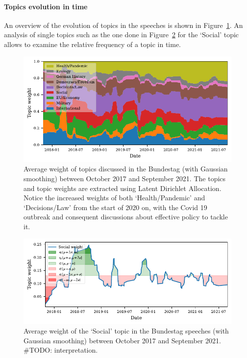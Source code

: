 \documentclass{article}
\begin{document}
\paragraph{Topics evolution in time}
An overview of the evolution of topics in the speeches is shown in Figure~\ref{stacked_area_plot}.
An analysis of single topics such as the one done in Figure~\ref{social_topic_plot} for the `Social' topic allows to examine the relative frequency of a topic in time.

\begin{figure}
  \centering
  \includegraphics[width=0.9\linewidth]{images/stacked_area_plot.pdf}
  \captionsetup{width=0.9\linewidth}
  \caption{
    Average weight of topics discussed in the Bundestag (with Gaussian smoothing) between October 2017 and September 2021.
    The topics and topic weights are extracted using Latent Dirichlet Allocation.
    Notice the increased weights of both `Health/Pandemic' and `Decisions/Law' from the start of 2020 on, with the Covid 19 outbreak and consequent discussions about effective policy to tackle it.
  }
  \label{stacked_area_plot}
\end{figure}

\begin{figure}
  \centering
  \includegraphics[width=0.9\linewidth]{images/Social.pdf}
  \captionsetup{width=0.9\linewidth}
  \caption{
    Average weight of the `Social' topic in the Bundestag speeches (with Gaussian smoothing) between October 2017 and September 2021.
    \#TODO: interpretation.
  }
  \label{social_topic_plot}
\end{figure}
\end{document}
